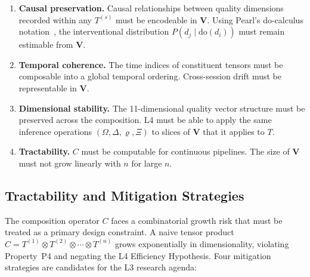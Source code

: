 \documentclass[11pt]{article}
\theoremstyle{definition}
\theoremstyle{remark}
\begin{document}
\begin{enumerate}[label=\textbf{P\arabic*.},leftmargin=2.5em]
  \item \textbf{Causal preservation.} Causal relationships between
    quality dimensions recorded within any $T^{(s)}$ must be
    encodeable in $\mathbf{V}$. Using Pearl's do-calculus
    notation~\cite{scholkopf2021causal}, the interventional
    distribution $P(d_j \mid \mathrm{do}(d_i))$ must remain
    estimable from $\mathbf{V}$.

  \item \textbf{Temporal coherence.} The time indices of constituent
    tensors must be composable into a global temporal ordering.
    Cross-session drift must be representable in $\mathbf{V}$.

  \item \textbf{Dimensional stability.} The 11-dimensional quality
    vector structure must be preserved across the composition. L4
    must be able to apply the same inference operations
    $(\Omega, \Delta, \varrho, \Xi)$ to slices of $\mathbf{V}$
    that it applies to $T$.

  \item \textbf{Tractability.} $C$ must be computable for continuous
    pipelines. The size of $\mathbf{V}$ must not grow linearly with
    $n$ for large $n$.
\end{enumerate}

\subsection{Tractability and Mitigation Strategies}
\label{sec:l3-tractability}

The composition operator $C$ faces a combinatorial growth risk that
must be treated as a primary design constraint. A naive tensor
product $C = T^{(1)} \otimes T^{(2)} \otimes \cdots \otimes T^{(n)}$
grows exponentially in dimensionality, violating Property~P4 and
negating the L4 Efficiency Hypothesis. Four mitigation strategies
are candidates for the L3 research agenda:
\end{document}
